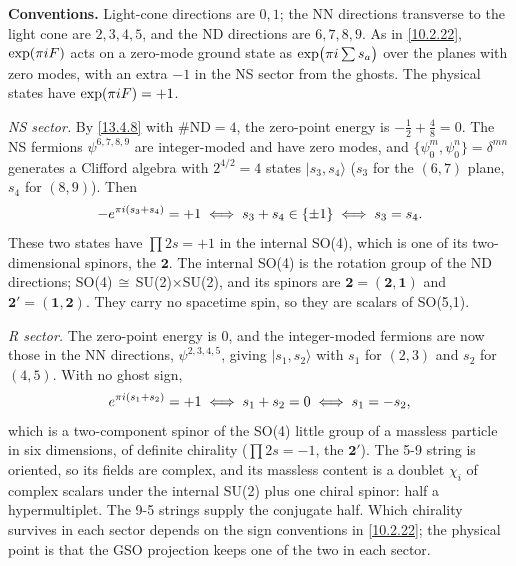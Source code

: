 \begin{tcolorbox}[breakable]
	\begin{remark}
		\textbf{Conventions.} Light-cone directions are $0,1$; the NN directions transverse to the light cone are $2,3,4,5$, and the ND directions are $6,7,8,9$. As in \eqref{10.2.22}, $\exp(\pi i F)$ acts on a zero-mode ground state as $\exp\bigl(\pi i\sum s_a\bigr)$ over the planes with zero modes, with an extra $-1$ in the NS sector from the ghosts. The physical states have $\exp(\pi i F)=+1$.

		\textit{NS sector.} By \eqref{13.4.8} with $\#\mathrm{ND}=4$, the zero-point energy is $-\frac12+\frac48=0$. The NS fermions $\psi^{6,7,8,9}$ are integer-moded and have zero modes, and $\{\psi^m_0,\psi^n_0\}=\delta^{mn}$ generates a Clifford algebra with $2^{4/2}=4$ states $|s_3,s_4\rangle$ ($s_3$ for the $(6,7)$ plane, $s_4$ for $(8,9)$). Then
		\begin{equation*}
			-e^{\pi i(s_3+s_4)}=+1 \;\Longleftrightarrow\; s_3+s_4\in\{\pm1\} \;\Longleftrightarrow\; s_3=s_4 .
		\end{equation*}
		These two states have $\prod2s=+1$ in the internal SO(4), which is one of its two-dimensional spinors, the $\mathbf 2$. The internal SO(4) is the rotation group of the ND directions; SO(4)$\,\cong\,$SU(2)$\times$SU(2), and its spinors are $\mathbf2=(\mathbf2,\mathbf1)$ and $\mathbf2'=(\mathbf1,\mathbf2)$. They carry no spacetime spin, so they are scalars of SO(5,1).

		\textit{R sector.} The zero-point energy is $0$, and the integer-moded fermions are now those in the NN directions, $\psi^{2,3,4,5}$, giving $|s_1,s_2\rangle$ with $s_1$ for $(2,3)$ and $s_2$ for $(4,5)$. With no ghost sign,
		\begin{equation*}
			e^{\pi i(s_1+s_2)}=+1 \;\Longleftrightarrow\; s_1+s_2=0 \;\Longleftrightarrow\; s_1=-s_2 ,
		\end{equation*}
		which is a two-component spinor of the SO(4) little group of a massless particle in six dimensions, of definite chirality ($\prod2s=-1$, the $\mathbf2'$). The 5-9 string is oriented, so its fields are complex, and its massless content is a doublet $\chi_i$ of complex scalars under the internal SU(2) plus one chiral spinor: half a hypermultiplet. The 9-5 strings supply the conjugate half. Which chirality survives in each sector depends on the sign conventions in \eqref{10.2.22}; the physical point is that the GSO projection keeps one of the two in each sector.
	\end{remark}
\end{tcolorbox}

